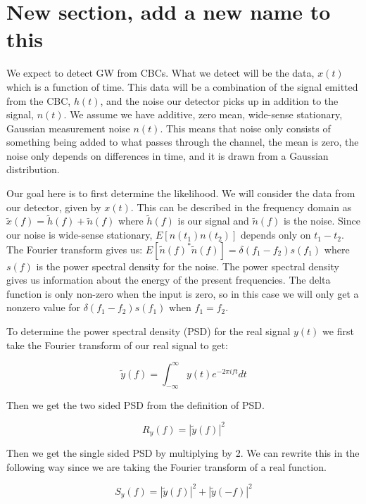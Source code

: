 \documentclass{iopart}
\begin{document}
\section{New section, add a new name to this}

We expect to detect GW from CBCs. What we detect will be the data, $x(t)$ which is a function of time. This data will be a combination of the signal emitted from the CBC,  $h(t)$, and the noise our detector picks up in addition to the signal, $n(t)$. We assume we have additive, zero mean, wide-sense stationary, Gaussian measurement noise $n(t)$. This means that noise only consists of something being added to what passes through the channel, the mean is zero, the noise only depends on differences in time, and it is drawn from a Gaussian distribution. 

Our goal here is to first determine the likelihood. We will consider the data from our detector, given by $x(t)$. This can be described in the frequency domain as $\tilde{x}(f) = \tilde{h}(f) + \tilde{n}(f)$ where $\tilde{h}(f)$ is our signal and $\tilde{n}(f)$ is the noise. Since our noise is wide-sense stationary, $E[n(t_1)n(t_2)]$ depends only on $t_1 - t_2$. The Fourier transform gives us: $E[\tilde{n}(f)^*\tilde{n}(f)] = \delta (f_1 - f_2) s(f_1)$ where $s(f)$ is the power spectral density for the noise. The power spectral density gives us information about the energy of the present frequencies. The delta function is only non-zero when the input is zero, so in this case we will only get a nonzero value for $\delta (f_1 - f_2) s(f_1)$ when $f_1 = f_2$. 

To determine the power spectral density (PSD) for the real signal $y(t)$ we first take the Fourier transform of our real signal to get:

\begin{equation}
	\tilde{y}(f) = \int_{-\infty}^{\infty}y(t)e^{-2\pi ift}dt
\end{equation}

Then we get the two sided PSD from the definition of PSD.
 
\begin{equation}
	R_y(f) = |\tilde{y}(f)|^2
\end{equation}

Then we get the single sided PSD by multiplying by 2. We can rewrite this in the following way since we are taking the Fourier transform of a real function.

\begin{equation}
	S_y(f) = |\tilde{y}(f)|^2 + |\tilde{y}(-f)|^2
\end{equation}
\end{document}
